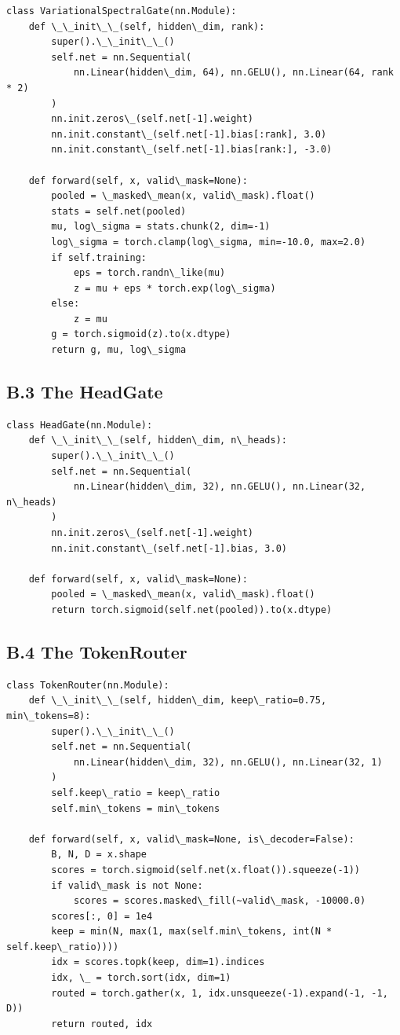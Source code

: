 \begin{lstlisting}
class VariationalSpectralGate(nn.Module):
    def \_\_init\_\_(self, hidden\_dim, rank):
        super().\_\_init\_\_()
        self.net = nn.Sequential(
            nn.Linear(hidden\_dim, 64), nn.GELU(), nn.Linear(64, rank * 2)
        )
        nn.init.zeros\_(self.net[-1].weight)
        nn.init.constant\_(self.net[-1].bias[:rank], 3.0)
        nn.init.constant\_(self.net[-1].bias[rank:], -3.0)
    
    def forward(self, x, valid\_mask=None):
        pooled = \_masked\_mean(x, valid\_mask).float()
        stats = self.net(pooled)
        mu, log\_sigma = stats.chunk(2, dim=-1)
        log\_sigma = torch.clamp(log\_sigma, min=-10.0, max=2.0)
        if self.training:
            eps = torch.randn\_like(mu)
            z = mu + eps * torch.exp(log\_sigma)
        else:
            z = mu
        g = torch.sigmoid(z).to(x.dtype)
        return g, mu, log\_sigma
\end{lstlisting}

\subsection{B.3 The HeadGate}

\begin{lstlisting}
class HeadGate(nn.Module):
    def \_\_init\_\_(self, hidden\_dim, n\_heads):
        super().\_\_init\_\_()
        self.net = nn.Sequential(
            nn.Linear(hidden\_dim, 32), nn.GELU(), nn.Linear(32, n\_heads)
        )
        nn.init.zeros\_(self.net[-1].weight)
        nn.init.constant\_(self.net[-1].bias, 3.0)
    
    def forward(self, x, valid\_mask=None):
        pooled = \_masked\_mean(x, valid\_mask).float()
        return torch.sigmoid(self.net(pooled)).to(x.dtype)
\end{lstlisting}

\subsection{B.4 The TokenRouter}

\begin{lstlisting}
class TokenRouter(nn.Module):
    def \_\_init\_\_(self, hidden\_dim, keep\_ratio=0.75, min\_tokens=8):
        super().\_\_init\_\_()
        self.net = nn.Sequential(
            nn.Linear(hidden\_dim, 32), nn.GELU(), nn.Linear(32, 1)
        )
        self.keep\_ratio = keep\_ratio
        self.min\_tokens = min\_tokens
    
    def forward(self, x, valid\_mask=None, is\_decoder=False):
        B, N, D = x.shape
        scores = torch.sigmoid(self.net(x.float()).squeeze(-1))
        if valid\_mask is not None:
            scores = scores.masked\_fill(~valid\_mask, -10000.0)
        scores[:, 0] = 1e4
        keep = min(N, max(1, max(self.min\_tokens, int(N * self.keep\_ratio))))
        idx = scores.topk(keep, dim=1).indices
        idx, \_ = torch.sort(idx, dim=1)
        routed = torch.gather(x, 1, idx.unsqueeze(-1).expand(-1, -1, D))
        return routed, idx
\end{lstlisting}

